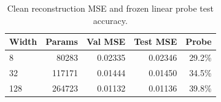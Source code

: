\begin{table}[ht]\centering\small
\caption{Clean reconstruction MSE and frozen linear probe test accuracy.}\label{tab:ae}
\begin{tabular}{lrrrr}
\toprule
Width & Params & Val MSE & Test MSE & Probe\\
\midrule
8 & 80283 & 0.02335 & 0.02346 & 29.2\%\\
32 & 117171 & 0.01444 & 0.01450 & 34.5\%\\
128 & 264723 & 0.01132 & 0.01136 & 39.8\%\\
\bottomrule\end{tabular}
\end{table}